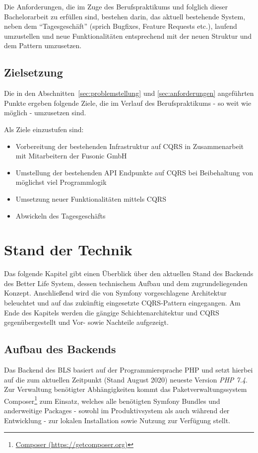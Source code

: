 \documentclass[a4paper,12pt,twoside]{scrreprt}
\begin{document}
\medskip

Die Anforderungen, die im Zuge des Berufspraktikums und folglich dieser Bachelorarbeit zu erfüllen sind, bestehen darin, das aktuell bestehende System, neben dem \enquote{Tagesgeschäft} (sprich Bugfixes, Feature Requests etc.), laufend umzustellen und neue Funktionalitäten entsprechend mit der neuen Struktur und dem Pattern umzusetzen.

\section{Zielsetzung}
\label{sec:zielsetzung}
Die in den Abschnitten~\ref{sec:problemstellung} und \ref{sec:anforderungen} angeführten Punkte ergeben folgende Ziele, die im Verlauf des Berufspraktikums - so weit wie möglich - umzusetzen sind.

\smallskip

\noindent
Als Ziele einzustufen sind:
\begin{itemize}
    \item Vorbereitung der bestehenden Infrastruktur auf CQRS in Zusammenarbeit mit Mitarbeitern der Fusonic GmbH
    \item Umstellung der bestehenden API Endpunkte auf CQRS bei Beibehaltung von möglichst viel Programmlogik
    \item Umsetzung neuer Funktionalitäten mittels CQRS
    \item Abwickeln des Tagesgeschäfts
\end{itemize}

\chapter{Stand der Technik}
\label{chap:stand-technik}
Das folgende Kapitel gibt einen Überblick über den aktuellen Stand des Backends des Better Life System, dessen technischem Aufbau und dem zugrundeliegenden Konzept. Anschließend wird die von Symfony vorgeschlagene Architektur beleuchtet und auf das zukünftig eingesetzte CQRS-Pattern eingegangen. Am Ende des Kapitels werden die gängige Schichtenarchitektur und CQRS gegenübergestellt und Vor- sowie Nachteile aufgezeigt.

\section{Aufbau des Backends}
\label{sec:aufbau-backend}
Das Backend des BLS basiert auf der Programmiersprache PHP und setzt hierbei auf die zum aktuellen Zeitpunkt (Stand August 2020) neueste Version \textit{PHP 7.4}. Zur Verwaltung benötigter Abhängigkeiten kommt das Paketverwaltungssystem Composer\footnote{\href{https://getcomposer.org}{Composer (https://getcomposer.org)}} zum Einsatz, welches alle benötigten Symfony Bundles und anderweitige Packages - sowohl im Produktivsystem als auch während der Entwicklung - zur lokalen Installation sowie Nutzung zur Verfügung stellt.
\end{document}
